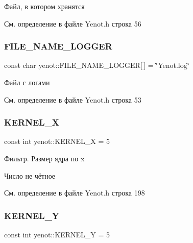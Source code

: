 Файл, в котором хранятся 



См. определение в файле Yenot.\+h строка 56

\mbox{\label{namespaceyenot_a6fdda6751433c679b7976669aff150b8}} 
\subsubsection{\texorpdfstring{F\+I\+L\+E\+\_\+\+N\+A\+M\+E\+\_\+\+L\+O\+G\+G\+ER}{FILE\_NAME\_LOGGER}}
{\footnotesize\ttfamily const char yenot\+::\+F\+I\+L\+E\+\_\+\+N\+A\+M\+E\+\_\+\+L\+O\+G\+G\+ER\mbox{[}$\,$\mbox{]} = \char`\"{}Yenot.\+log\char`\"{}}



Файл с логами 



См. определение в файле Yenot.\+h строка 53

\mbox{\label{namespaceyenot_aa753d0e3e99fb4b37b3930996bdfe563}} 
\subsubsection{\texorpdfstring{K\+E\+R\+N\+E\+L\+\_\+X}{KERNEL\_X}}
{\footnotesize\ttfamily const int yenot\+::\+K\+E\+R\+N\+E\+L\+\_\+X = 5}

Фильтр. Размер ядра по x

Число не чётное 

См. определение в файле Yenot.\+h строка 198

\mbox{\label{namespaceyenot_a33a5af73a30e2b5684ee02cc4bf4c374}} 
\subsubsection{\texorpdfstring{K\+E\+R\+N\+E\+L\+\_\+Y}{KERNEL\_Y}}
{\footnotesize\ttfamily const int yenot\+::\+K\+E\+R\+N\+E\+L\+\_\+Y = 5}

